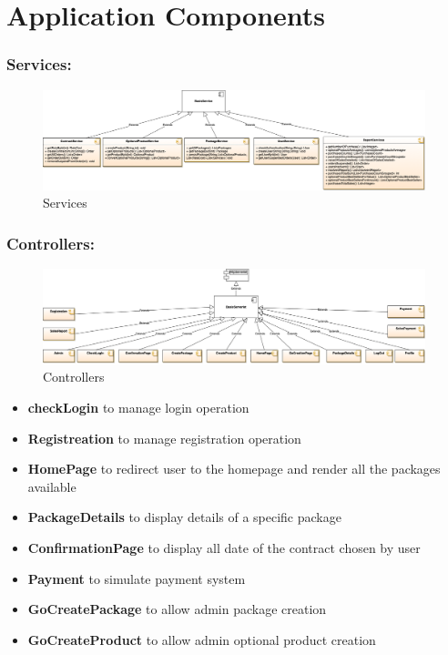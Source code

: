 \documentclass{article}
\begin{document}
\newpage
\section{Application Components}
\subsubsection{Services:}
\begin{figure}[hbt!]
\centering
\includegraphics[width=0.99\textwidth]{services.png}
\caption{Services}
\end{figure}
\subsubsection{Controllers:}
\begin{figure}[hbt!]
\centering
\includegraphics[width=0.99\textwidth]{controllers.png}
\caption{Controllers}
\end{figure}
\begin{itemize}
	\item \textbf{checkLogin} to manage login operation
	\item \textbf{Registreation} to manage registration operation
	\item \textbf{HomePage} to redirect user to the homepage and render all the packages available
	\item \textbf{PackageDetails} to display details of a specific package
	\item \textbf{ConfirmationPage} to display all date of the contract chosen by user
	\item \textbf{Payment} to simulate payment system
	\item \textbf{GoCreatePackage} to allow admin package creation
	\item \textbf{GoCreateProduct} to allow admin optional product creation
\end{itemize}
\end{document}
